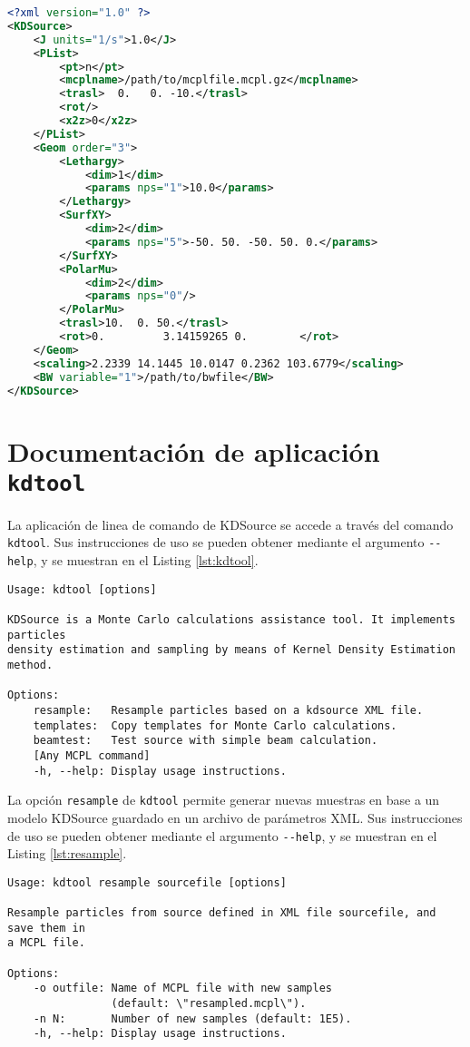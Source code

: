 \begin{lstlisting}[language=XML, label={lst:xmlfile}, caption=Ejemplo de archivo de parámetros XML.]
<?xml version="1.0" ?>
<KDSource>
	<J units="1/s">1.0</J>
	<PList>
		<pt>n</pt>
		<mcplname>/path/to/mcplfile.mcpl.gz</mcplname>
		<trasl>  0.   0. -10.</trasl>
		<rot/>
		<x2z>0</x2z>
	</PList>
	<Geom order="3">
		<Lethargy>
			<dim>1</dim>
			<params nps="1">10.0</params>
		</Lethargy>
		<SurfXY>
			<dim>2</dim>
			<params nps="5">-50. 50. -50. 50. 0.</params>
		</SurfXY>
		<PolarMu>
			<dim>2</dim>
			<params nps="0"/>
		</PolarMu>
		<trasl>10.  0. 50.</trasl>
		<rot>0.         3.14159265 0.        </rot>
	</Geom>
	<scaling>2.2339 14.1445 10.0147 0.2362 103.6779</scaling>
	<BW variable="1">/path/to/bwfile</BW>
</KDSource>
\end{lstlisting}




\section{Documentación de aplicación \texttt{kdtool}}
\label{ap:CLI}

La aplicación de linea de comando de KDSource se accede a través del comando \verb|kdtool|. Sus instrucciones de uso se pueden obtener mediante el argumento \verb|--help|, y se muestran en el Listing \ref{lst:kdtool}.

\begin{lstlisting}[label={lst:kdtool}, caption=Instrucciones de uso del comando \texttt{kdtool} (output de ``\texttt{kdtool --help}'').]
Usage: kdtool [options]

KDSource is a Monte Carlo calculations assistance tool. It implements particles
density estimation and sampling by means of Kernel Density Estimation method.

Options:
	resample:   Resample particles based on a kdsource XML file.
	templates:  Copy templates for Monte Carlo calculations.
	beamtest:   Test source with simple beam calculation.
	[Any MCPL command]
	-h, --help: Display usage instructions.
\end{lstlisting}

La opción \verb|resample| de \verb|kdtool| permite generar nuevas muestras en base a un modelo KDSource guardado en un archivo de parámetros XML. Sus instrucciones de uso se pueden obtener mediante el argumento \verb|--help|, y se muestran en el Listing \ref{lst:resample}.

\begin{lstlisting}[label={lst:resample}, caption=Instrucciones de uso del comando \texttt{kdtool resample} (output de ``\texttt{kdtool resample --help}'').]
Usage: kdtool resample sourcefile [options]

Resample particles from source defined in XML file sourcefile, and save them in
a MCPL file.

Options:
	-o outfile: Name of MCPL file with new samples
	            (default: \"resampled.mcpl\").
	-n N:       Number of new samples (default: 1E5).
	-h, --help: Display usage instructions.
\end{lstlisting}

